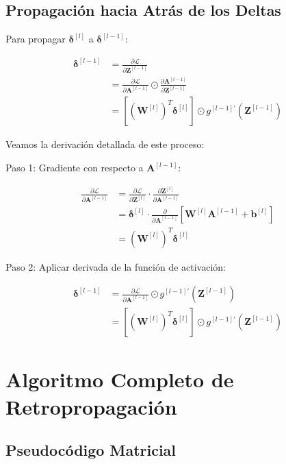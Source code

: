 \documentclass[12pt]{article}
\begin{document}
\subsection{Propagación hacia Atrás de los Deltas}

Para propagar $\boldsymbol{\delta}^{[l]}$ a $\boldsymbol{\delta}^{[l-1]}$:

\begin{align}
\boldsymbol{\delta}^{[l-1]} &= \frac{\partial \mathcal{L}}{\partial \mathbf{Z}^{[l-1]}} \\
&= \frac{\partial \mathcal{L}}{\partial \mathbf{A}^{[l-1]}} \odot \frac{\partial \mathbf{A}^{[l-1]}}{\partial \mathbf{Z}^{[l-1]}} \\
&= \left[(\mathbf{W}^{[l]})^T \boldsymbol{\delta}^{[l]}\right] \odot g^{[l-1]'}(\mathbf{Z}^{[l-1]})
\end{align}

Veamos la derivación detallada de este proceso:

Paso 1: Gradiente con respecto a $\mathbf{A}^{[l-1]}$:

\begin{align}
\frac{\partial \mathcal{L}}{\partial \mathbf{A}^{[l-1]}} &= \frac{\partial \mathcal{L}}{\partial \mathbf{Z}^{[l]}} \cdot \frac{\partial \mathbf{Z}^{[l]}}{\partial \mathbf{A}^{[l-1]}} \\
&= \boldsymbol{\delta}^{[l]} \cdot \frac{\partial}{\partial \mathbf{A}^{[l-1]}} \left[\mathbf{W}^{[l]} \mathbf{A}^{[l-1]} + \mathbf{b}^{[l]}\right] \\
&= (\mathbf{W}^{[l]})^T \boldsymbol{\delta}^{[l]}
\end{align}

Paso 2: Aplicar derivada de la función de activación:

\begin{align}
\boldsymbol{\delta}^{[l-1]} &= \frac{\partial \mathcal{L}}{\partial \mathbf{A}^{[l-1]}} \odot g^{[l-1]'}(\mathbf{Z}^{[l-1]}) \\
&= \left[(\mathbf{W}^{[l]})^T \boldsymbol{\delta}^{[l]}\right] \odot g^{[l-1]'}(\mathbf{Z}^{[l-1]})
\end{align}





\section{Algoritmo Completo de Retropropagación}

\subsection{Pseudocódigo Matricial}
\end{document}
